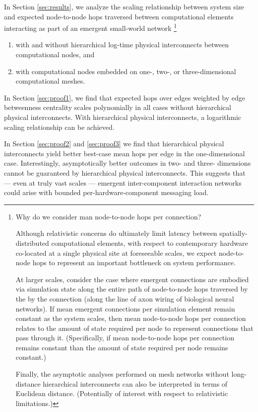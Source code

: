 In Section \ref{sec:results}, we analyze the scaling relationship between system size and expected node-to-node hops traversed between computational elements interacting as part of an emergent small-world network
\footnote{
Why do we consider man node-to-node hops per connection?

Although relativistic concerns do ultimately limit latency between spatially-distributed computational elements, with respect to contemporary hardware co-located at a single physical site at foreseeable scales, we expect node-to-node hops to represent an important bottleneck on system performance.

At larger scales, consider the case where emergent connections are embodied via simulation state along the entire path of node-to-node hops traversed by the by the connection (along the line of axon wiring of biological neural networks).
If mean emergent connections per simulation element remain constant as the system scales, then mean node-to-node hops per connection relates to the amount of state required per node to represent connections that pass through it.
(Specifically, if mean node-to-node hops per connection remains constant than the amount of state required per node remains constant.)

Finally, the asymptotic analyses performed on mesh networks without long-distance hierarchical interconnects can also be interpreted in terms of Euclidean distance.
(Potentially of interest with respect to relativistic limitations.)
}
\begin{enumerate}
\item with and without hierarchical log-time physical interconnects between computational nodes, and
\item with computational nodes embedded on one-, two-, or three-dimensional computational meshes.
\end{enumerate}

In Section \ref{sec:proof1}, we find that expected hops over edges weighted by edge betweenness centrality scales polynomially in all cases without hierarchical physical interconnects.
With hierarchical physical interconnects, a logarithmic scaling relationship can be achieved.

In Section \ref{sec:proof2} and \ref{sec:proof3} we find that hierarchical physical interconnects yield better best-case mean hops per edge in the one-dimensional case.
Interestingly, asymptotically better outcomes in two- and three- dimensions cannot be guaranteed by hierarchical physical interconnects.
This suggests that --- even at truly vast scales --- emergent inter-component interaction networks could arise with bounded per-hardware-component messaging load.


